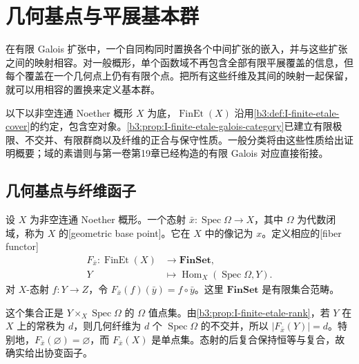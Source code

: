
\section{几何基点与平展基本群}
\label{b3:sec:I02}

在有限 Galois 扩张中，一个自同构同时置换各个中间扩张的嵌入，并与这些扩张之间的映射相容。对一般概形，单个函数域不再包含全部有限平展覆盖的信息，但每个覆盖在一个几何点上仍有有限个点。把所有这些纤维及其间的映射一起保留，就可以用相容的置换来定义基本群。

\ProseParagraphBreak
以下以非空连通 Noether 概形 \(X\) 为底，\(\operatorname{FinEt}(X)\) 沿用\cref{b3:def:I-finite-etale-cover}的约定，包含空对象。\cref{b3:prop:I-finite-etale-galois-category}已建立有限极限、不交并、有限群商以及纤维的正合与保守性质。一般分类将由这些性质给出证明概要；域的素谱则与第一卷第19章已经构造的有限 Galois 对应直接衔接。

\subsection{几何基点与纤维函子}
\label{b3:subsec:I02:01}

\begin{definition}\label{b3:def:I-geometric-fiber}
	设 \(X\) 为非空连通 Noether 概形。一个态射 \(\bar x:\operatorname{Spec}\Omega\rightarrow X\)，其中 \(\Omega\) 为代数闭域，称为 \(X\) 的[geometric base point]。它在 \(X\) 中的像记为 \(x\)。定义相应的[fiber functor]
	\[
		\begin{aligned}
			F_{\bar x}:\operatorname{FinEt}(X)&\longrightarrow\mathbf{FinSet},\\
			Y&\longmapsto\operatorname{Hom}_X(\operatorname{Spec}\Omega,Y).
		\end{aligned}
	\]
	对 \(X\)-态射 \(f:Y\rightarrow Z\)，令 \(F_{\bar x}(f)(\bar y)=f\circ\bar y\)。这里 \(\mathbf{FinSet}\) 是有限集合范畴。
\end{definition}

这个集合正是 \(Y\times_X\operatorname{Spec}\Omega\) 的 \(\Omega\) 值点集。由\cref{b3:prop:I-finite-etale-rank}，若 \(Y\) 在 \(X\) 上的常秩为 \(d\)，则几何纤维为 \(d\) 个 \(\operatorname{Spec}\Omega\) 的不交并，所以 \(|F_{\bar x}(Y)|=d\)。特别地，\(F_{\bar x}(\varnothing)=\varnothing\)，而 \(F_{\bar x}(X)\) 是单点集。态射的后复合保持恒等与复合，故确实给出协变函子。

